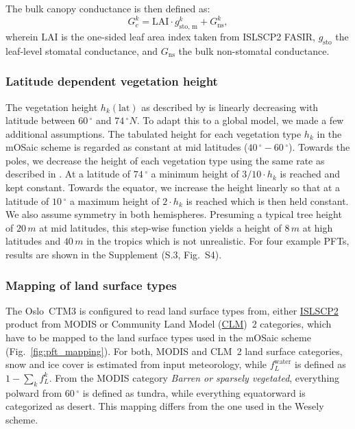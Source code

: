 \documentclass[gmd, manuscript]{copernicus}
\begin{document}
The bulk canopy conductance is then defined as:
\begin{equation}
  G_c^k = \text{LAI} \cdot g^k_\text{sto, m} + G^k_\text{ns}, 
\end{equation}
wherein $\text{LAI}$ is the one-sided leaf area index taken from ISLSCP2 FASIR, $g_\text{sto}$ the leaf-level stomatal conductance, and $G_\text{ns}$ the bulk non-stomatal conductance.\\

\subsubsection{Latitude dependent vegetation height}
The vegetation height $h_k(\text{lat})$ as described by \citet{ACP:Simpson2012} is linearly decreasing with latitude between $60\,\unit{^\circ}$ and $74\,\unit{^\circ N}$. To adapt this to a global model, we made a few additional assumptions. The tabulated height for each vegetation type $h_k$ in the mOSaic scheme is regarded as constant at mid latitudes ($40\,\unit{^\circ}-60\,\unit{^\circ}$). Towards the poles, we decrease the height of each vegetation type using the same rate as described in \citet{ACP:Simpson2012}. At a latitude of $74\,\unit{^\circ}$ a minimum height of $3/10 \cdot h_k$ is reached and kept constant. Towards the equator, we increase the height linearly so that at a latitude of $10\,\unit{^\circ}$ a maximum height of $2 \cdot h_k$ is reached which is then held constant. We also assume symmetry in both hemispheres. Presuming a typical tree height of $20\,\unit{m}$ at mid latitudes, this step-wise function yields a height of $8\,\unit{m}$ at high latitudes and $40\,\unit{m}$ in the tropics which is not unrealistic. For four example PFTs, results are shown in the Supplement (S.3, Fig.~S4).

\subsubsection{Mapping of land surface types}
The Oslo~CTM3 is configured to read land surface types from, either \href{https://daac.ornl.gov/cgi-bin/dataset_lister.pl?p=29}{ISLSCP2} product from MODIS or Community Land Model (\href{http://www.cgd.ucar.edu/tss/clm/}{CLM})~2 categories, which have to be mapped to the land surface types used in the mOSaic scheme (Fig.~\ref{fig:pft_mapping}). For both, MODIS and CLM~2 land surface categories, snow and ice cover is estimated from input meteorology, while $f_L^\text{water}$ is defined as $1-\sum_{k} f_L^k$. From the MODIS category \emph{Barren or sparsely vegetated}, everything polward from $60\,\unit{^\circ}$ is defined as tundra, while everything equatorward is categorized as desert. This mapping differs from the one used in the Wesely scheme.
\end{document}
